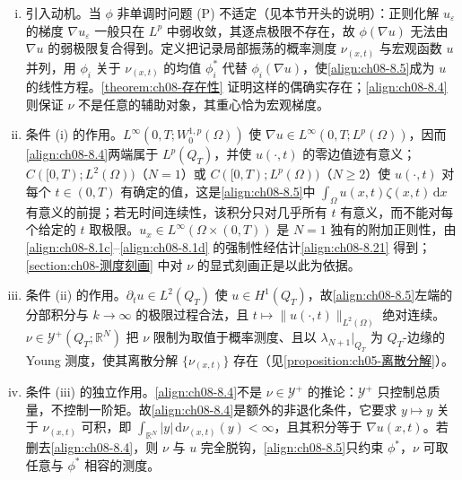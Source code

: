 \documentclass[../../main.tex]{subfiles}%
\begin{document}
\begin{remark}\label{remark:ch08-Young测度值解}
\begin{enumerate}[(i)]
\item 引入动机。当 $\phi$ 非单调时问题 (P) 不适定（见本节开头的说明）：正则化解 $u_\varepsilon$ 的梯度 $\nabla u_\varepsilon$ 一般只在 $L^p$ 中弱收敛，其逐点极限不存在，故 $\phi(\nabla u)$ 无法由 $\nabla u$ 的弱极限复合得到。定义把记录局部振荡的概率测度 $\nu_{(x,t)}$ 与宏观函数 $u$ 并列，用 $\phi_i$ 关于 $\nu_{(x,t)}$ 的均值 $\phi^*_i$ 代替 $\phi_i(\nabla u)$，使\eqref{align:ch08-8.5}成为 $u$ 的线性方程。\cref{theorem:ch08-存在性} 证明这样的偶确实存在；\eqref{align:ch08-8.4}则保证 $\nu$ 不是任意的辅助对象，其重心恰为宏观梯度。
\item 条件 (i) 的作用。$L^\infty(0,T;W^{1,p}_0(\Omega))$ 使 $\nabla u\in L^\infty(0,T;L^p(\Omega))$，因而\eqref{align:ch08-8.4}两端属于 $L^p(Q_T)$，并使 $u(\cdot,t)$ 的零边值迹有意义；$C([0,T);L^2(\Omega))$（$N=1$）或 $C([0,T);L^p(\Omega))$（$N\geqslant2$）使 $u(\cdot,t)$ 对每个 $t\in(0,T)$ 有确定的值，这是\eqref{align:ch08-8.5}中 $\int_\Omega u(x,t)\zeta(x,t)\,\mathrm{d}x$ 有意义的前提；若无时间连续性，该积分只对几乎所有 $t$ 有意义，而不能对每个给定的 $t$ 取极限。$u_x\in L^\infty(\Omega\times(0,T))$ 是 $N=1$ 独有的附加正则性，由\eqref{align:ch08-8.1c}--\eqref{align:ch08-8.1d} 的强制性经估计\eqref{align:ch08-8.21} 得到；\cref{section:ch08-测度刻画} 中对 $\nu$ 的显式刻画正是以此为依据。
\item 条件 (ii) 的作用。$\partial_t u\in L^2(Q_T)$ 使 $u\in H^1(Q_T)$，故\eqref{align:ch08-8.5}左端的分部积分与 $k\to\infty$ 的极限过程合法，且 $t\mapsto\|u(\cdot,t)\|_{L^2(\Omega)}$ 绝对连续。$\nu\in\mathcal{Y}^+(Q_T;\mathbb{R}^N)$ 把 $\nu$ 限制为取值于概率测度、且以 $\lambda_{N+1}|_{Q_T}$ 为 $Q_T$-边缘的 Young 测度，使其离散分解 $\{\nu_{(x,t)}\}$ 存在（见\cref{proposition:ch05-离散分解}）。
\item 条件 (iii) 的独立作用。\eqref{align:ch08-8.4}不是 $\nu\in\mathcal{Y}^+$ 的推论：$\mathcal{Y}^+$ 只控制总质量，不控制一阶矩。故\eqref{align:ch08-8.4}是额外的非退化条件，它要求 $y\mapsto y$ 关于 $\nu_{(x,t)}$ 可积，即 $\int_{\mathbb{R}^N}|y|\,\mathrm{d}\nu_{(x,t)}(y)<\infty$，且其积分等于 $\nabla u(x,t)$。若删去\eqref{align:ch08-8.4}，则 $\nu$ 与 $u$ 完全脱钩，\eqref{align:ch08-8.5}只约束 $\phi^*$，$\nu$ 可取任意与 $\phi^*$ 相容的测度。

\end{enumerate}
\end{remark}
\end{document}
